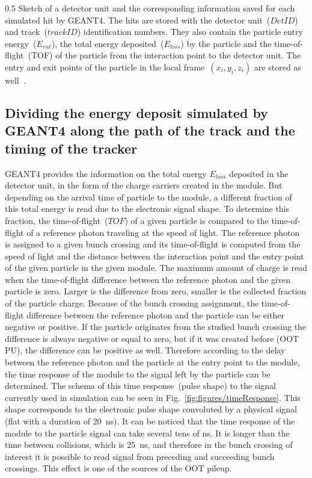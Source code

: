                  {0.5}       %
                 { Sketch of a detector unit and the corresponding information saved for each simulated hit by GEANT4. The hits are stored with the detector unit~($DetID$) and track~($trackID$) identification numbers. They also contain the particle entry energy~($E_{ent}$), the total energy deposited~($E_{loss}$) by the particle and the time-of-flight~(TOF) of the particle from the interaction point to the detector unit. The entry and exit points of the particle in the local frame~$(x_{i},y_{i},z_{i})$ are stored as well~\cite{website:simuBasics}. }

\subsection{Dividing the energy deposit simulated by GEANT4 along the path of the track and the timing of the tracker~\label{sec:divide}}

GEANT4 provides the information on the total energy $E_{loss}$ deposited in the detector unit, in the form of the charge carriers created in the module. But depending on the arrival time of particle to the module, a different fraction of this total energy is read due to the electronic signal shape. To determine this fraction, the time-of-flight~($TOF$) of a given particle is compared to the time-of-flight of a reference photon traveling at the speed of light. The reference photon is assigned to a given bunch crossing and its time-of-flight is computed from the speed of light and the distance between the interaction point and the entry point of the given particle in the given module. The maximum amount of charge is read when the time-of-flight difference between the reference photon and the given particle is zero. Larger is the difference from zero, smaller is the collected fraction of the particle charge. Because of the bunch crossing assignment, the time-of-flight difference between the reference photon and the particle can be either negative or positive. If the particle originates from the studied bunch crossing the difference is always negative or equal to zero, but if it was created before (OOT PU), the difference can be positive as well. Therefore according to the delay between the reference photon and the particle at the entry point to the module, the time response of the module to the signal left by the particle can be determined. The schema of this time response~(pulse shape) to the signal currently used in simulation can be seen in Fig.~\ref{fig:figures/timeResponse}. This shape corresponds to the electronic pulse shape convoluted by a physical signal (flat with a duration  of 20~ns). It can be noticed that the time response of the module to the particle signal can take several tens of ns. It is longer than the time between collisions, which is 25~ns, and therefore in the bunch crossing of interest it is possible to read signal from preceding and succeeding bunch crossings. This effect is one of the sources of the OOT pileup.

